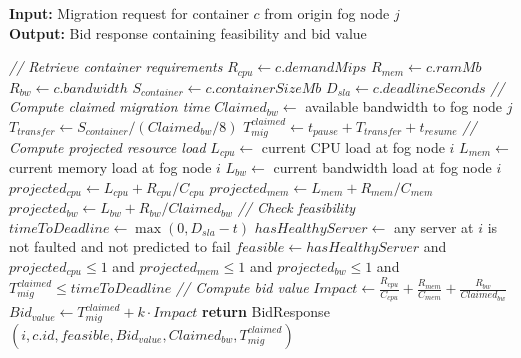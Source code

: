 \documentclass{article}
\begin{document}
\begin{algorithm}[h!]
\caption{Bid Calculation at Candidate Fog Node $i$}
\label{alg:bid_calculation}
\textbf{Input:} Migration request for container $c$ from origin fog node $j$ \\
\textbf{Output:} Bid response containing feasibility and bid value
\begin{algorithmic}[1]
\State \textit{// Retrieve container requirements}
\State $R_{cpu} \gets c.demandMips$
\State $R_{mem} \gets c.ramMb$
\State $R_{bw} \gets c.bandwidth$
\State $S_{container} \gets c.containerSizeMb$
\State $D_{sla} \gets c.deadlineSeconds$
\State
\State \textit{// Compute claimed migration time}
\State $Claimed_{bw} \gets$ available bandwidth to fog node $j$ 
\State $T_{transfer} \gets S_{container} / (Claimed_{bw} / 8)$
\State $T^{claimed}_{mig} \gets t_{pause} + T_{transfer} + t_{resume}$
\State
\State \textit{// Compute projected resource load}
\State $L_{cpu} \gets$ current CPU load at fog node $i$
\State $L_{mem} \gets$ current memory load at fog node $i$
\State $L_{bw} \gets$ current bandwidth load at fog node $i$
\State $projected_{cpu} \gets L_{cpu} + R_{cpu} / C_{cpu}$
\State $projected_{mem} \gets L_{mem} + R_{mem} / C_{mem}$
\State $projected_{bw} \gets L_{bw} + R_{bw} / Claimed_{bw}$
\State
\State \textit{// Check feasibility}
\State $timeToDeadline \gets \max(0, D_{sla} - t)$
\State $hasHealthyServer \gets$ any server at $i$ is not faulted and not predicted to fail
\State $feasible \gets hasHealthyServer$ and $projected_{cpu} \leq 1$ and $projected_{mem} \leq 1$ 
\State \hspace{3em} and $projected_{bw} \leq 1$ and $T^{claimed}_{mig} \leq timeToDeadline$
\State
\State \textit{// Compute bid value}
\State $Impact \gets \frac{R_{cpu}}{C_{cpu}} + \frac{R_{mem}}{C_{mem}} + \frac{R_{bw}}{Claimed_{bw}}$
\State $Bid_{value} \gets T^{claimed}_{mig} + k \cdot Impact$ 
\State
\State \textbf{return} BidResponse$(i, c.id, feasible, Bid_{value}, Claimed_{bw}, T^{claimed}_{mig})$
\end{algorithmic}
\end{algorithm}
\end{document}
